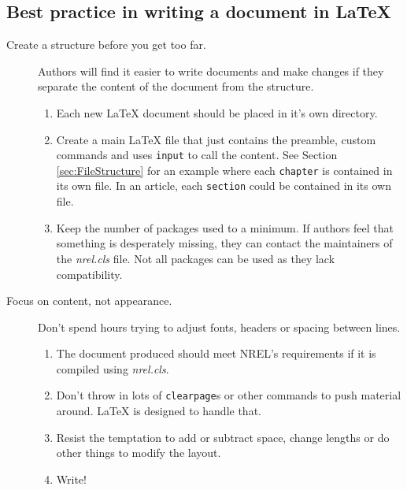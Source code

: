 \subsection{Best practice in writing a document in LaTeX}
\begin{description}
\item[Create a structure before you get too far.] Authors will find it easier to write documents and make changes if they separate the content of the document from the structure.
\begin{enumerate}
\item Each new LaTeX document should be placed in it's own directory. 
\item Create a main LaTeX file that just contains the preamble, custom commands and uses \texttt{input} to call the content. See Section \ref{sec:FileStructure} for an example where each \texttt{chapter} is contained in its own file. In an article, each \texttt{section} could be contained in its own file.
\item Keep the number of packages used to a minimum. If authors feel that something is desperately missing, they can contact the maintainers of the \emph{nrel.cls} file. Not all packages can be used as they lack compatibility.
\end{enumerate}
\item[Focus on content, not appearance.] Don't spend hours trying to adjust fonts, headers or spacing between lines. 
\begin{enumerate}
\item The document produced should meet NREL's requirements if it is compiled using \emph{nrel.cls}. 
\item Don't throw in lots of \texttt{clearpage}s or other commands to push material around. LaTeX is designed to handle that. 
\item Resist the temptation to add or subtract space, change lengths or do other things to modify the layout. 
\item Write!
\end{enumerate}
\end{description}
